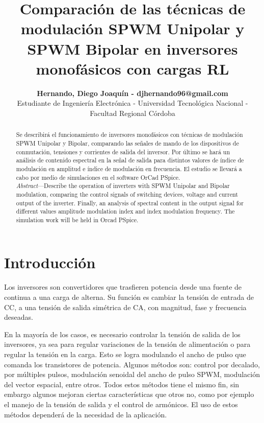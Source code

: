 \documentclass[conference]{IEEEtran}
\begin{document}
\title{Comparación de las técnicas de modulación SPWM Unipolar y SPWM Bipolar en inversores monofásicos con cargas RL}
\author{
		\begin{tabular}{c}
			\textbf{Hernando, Diego Joaquín - djhernando96@gmail.com} \\ 
			Estudiante de Ingeniería Electrónica - Universidad Tecnológica Nacional - Facultad Regional Córdoba
		\end{tabular}
		}
\maketitle

\begin{abstract}
Se describirá el funcionamiento de inversores monofásicos con técnicas de modulación SPWM Unipolar y Bipolar, comparando las señales de mando de los dispositivos de conmutación, tensiones y corrientes de salida del inversor. Por último se hará un análisis de contenido espectral en la señal de salida para distintos valores de índice de modulación en amplitud e índice de modulación en frecuencia. El estudio se llevará a cabo por medio de simulaciones en el software OrCad PSpice.\\


\textit{Abstract}---Describe the operation of inverters with SPWM Unipolar and Bipolar modulation, comparing the control signals of switching devices, voltage and current output of the inverter. Finally, an analysis of spectral content in the output signal for different values amplitude modulation index and index modulation frequency. The simulation work will be held in Orcad PSpice. 
\end{abstract} 

\IEEEpeerreviewmaketitle

\section{Introducción}
Los inversores son convertidores que trasfieren potencia desde una fuente de continua a una carga de alterna. Su función es cambiar la tensión de entrada de CC, a una tensión de salida simétrica de CA, con magnitud, fase y frecuencia deseadas.

En la mayoría de los casos, es necesario controlar la tensión de salida de los inversores, ya sea para regular variaciones de la tensión de alimentación o para regular la tensión en la carga. Esto se logra modulando el ancho de pulso que comanda los transistores de potencia. Algunos métodos son: control por decalado, por múltiples pulsos, modulación senoidal del ancho de pulso SPWM, modulación del vector espacial, entre otros. Todos estos métodos tiene el mismo fin, sin embargo algunos mejoran ciertas características que otros no, como por ejemplo el manejo de la tensión de salida y el control de armónicos. El uso de estos métodos dependerá de la necesidad de la aplicación.
\end{document}
